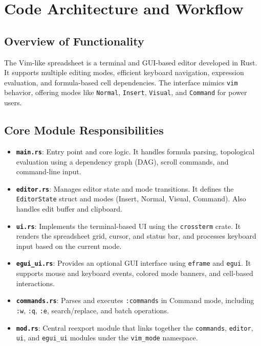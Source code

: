 \documentclass{article}
\begin{document}
\section{Code Architecture and Workflow}

\subsection{Overview of Functionality}

The Vim-like spreadsheet is a terminal and GUI-based editor developed in Rust. It supports multiple editing modes, efficient keyboard navigation, expression evaluation, and formula-based cell dependencies. The interface mimics \texttt{vim} behavior, offering modes like \texttt{Normal}, \texttt{Insert}, \texttt{Visual}, and \texttt{Command} for power users.

\subsection{Core Module Responsibilities}

\begin{itemize}
  \item \textbf{\texttt{main.rs}}: Entry point and core logic. It handles formula parsing, topological evaluation using a dependency graph (DAG), scroll commands, and command-line input.
  \item \textbf{\texttt{editor.rs}}: Manages editor state and mode transitions. It defines the \texttt{EditorState} struct and modes (Insert, Normal, Visual, Command). Also handles edit buffer and clipboard.
  \item \textbf{\texttt{ui.rs}}: Implements the terminal-based UI using the \texttt{crossterm} crate. It renders the spreadsheet grid, cursor, and status bar, and processes keyboard input based on the current mode.
  \item \textbf{\texttt{egui\_ui.rs}}: Provides an optional GUI interface using \texttt{eframe} and \texttt{egui}. It supports mouse and keyboard events, colored mode banners, and cell-based interactions.
  \item \textbf{\texttt{commands.rs}}: Parses and executes \texttt{:commands} in Command mode, including \texttt{:w}, \texttt{:q}, \texttt{:e}, search/replace, and batch operations.
  \item \textbf{\texttt{mod.rs}}: Central re\-export module that links together the \texttt{commands}, \texttt{editor}, \texttt{ui}, and \texttt{egui\_ui} modules under the \texttt{vim\_mode} namespace.
\end{itemize}
\end{document}
